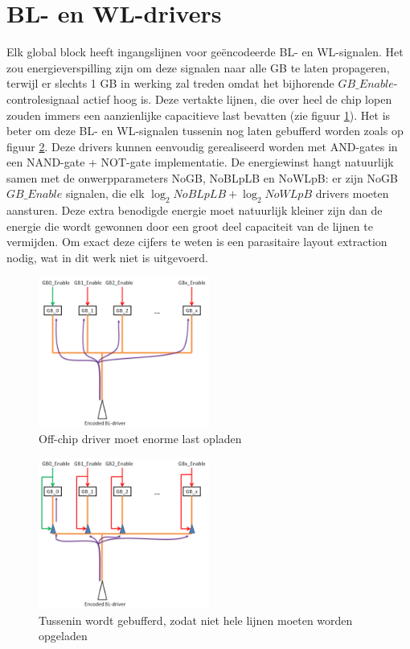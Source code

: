 \section{BL- en WL-drivers}
Elk global block heeft ingangslijnen voor geëncodeerde BL- en WL-signalen. Het zou energieverspilling zijn om deze signalen naar alle GB te laten propageren, terwijl er slechts 1 GB in werking zal treden omdat het bijhorende $GB\_{Enable}$-controlesignaal actief hoog is. Deze vertakte lijnen, die over heel de chip lopen zouden immers een aanzienlijke capacitieve last bevatten (zie figuur \ref{fig:nodrivers}). Het is beter om deze BL- en WL-signalen tussenin nog laten gebufferd worden zoals op figuur \ref{fig:drivers}. Deze drivers kunnen eenvoudig gerealiseerd worden met AND-gates in een NAND-gate + NOT-gate implementatie.
De energiewinst hangt natuurlijk samen met de onwerpparameters NoGB, NoBLpLB en NoWLpB: er zijn NoGB $GB\_{Enable}$ signalen, die elk $\log_2 NoBLpLB +\log_2 NoWLpB$ drivers moeten aansturen. Deze extra benodigde energie moet natuurlijk kleiner zijn dan de energie die wordt gewonnen door een groot deel capaciteit van de lijnen te vermijden. Om exact deze cijfers te weten is een parasitaire layout extraction nodig, wat in dit werk niet is uitgevoerd.

\begin{figure}[h!]
  \centering
  \includegraphics[width=0.5\textwidth]{../fig/hfdstk-periphery-nodrivers.png}
  \caption[BL- en WL-drivers]{Off-chip driver moet enorme last opladen}
  \label{fig:nodrivers}
\end{figure}
\begin{figure}[h!]
  \centering
  \includegraphics[width=0.5\textwidth]{../fig/hfdstk-periphery-drivers.png}
  \caption[BL- en WL-drivers]{Tussenin wordt gebufferd, zodat niet hele lijnen moeten worden opgeladen}
  \label{fig:drivers}
\end{figure}

